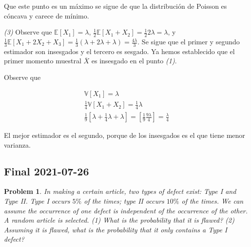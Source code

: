 \documentclass[a4paper, 12pt]{article}
\newtheorem{problem}{Problem}
\newtheorem{problem}{Problem}
\begin{document}
Que este punto es un máximo se sigue de que la distribución de Poisson es
cóncava y carece de mínimo. 

\textit{(3)} Observe que $\mathbb{E}[X_1] = \lambda$,
$\frac{1}{2}\mathbb{E}\left[ X_1 + X_2 \right] = \frac{1}{2}2\lambda = \lambda$,
y $\frac{1}{3}\mathbb{E}\left[ X_1 + 2X_2+X_3 \right] = \frac{1}{3} \left(
\lambda + 2 \lambda + \lambda \right) = \frac{4\lambda}{3} $. Se sigue que el
primer y segundo estimador son insesgados y el tercero es sesgado. Ya hemos
establecido que el primer momento muestral $\overline{X}$ es insesgado en el
punto \textit{(1)}.

Observe que 

\begin{align*}
    \mathbb{V}\left[ X_1 \right] = \lambda \\ 
    \frac{1}{4}\mathbb{V}\left[ X_1 + X_2 \right] = \frac{1}{4}\lambda \\ 
    \frac{1}{9}\left[ \lambda + \frac{1}{4}\lambda + \lambda \right] = \left[
    \frac{1}{9} \frac{9\lambda}{4} \right] = \frac{\lambda}{4}
\end{align*}

El mejor estimador es el segundo, porque de los insesgados es el que tiene menor
varianza.

\subsection{Final 2021-07-26}

\begin{problem}
    In making a certain article, two types of defect exist: Type I and Type II.
    Type I occurs $5\%$ of the times; type II occurs $10\%$ of the times. We can
    assume the occurrence of one defect is independent of the occurrence of the
    other. A random article is selected. \textit{(1)} What is the probability
    that it is flawed? \textit{(2)} Assuming it is flawed, what is the
    probability that it only contains a Type I defect?
\end{problem}
\end{document}
